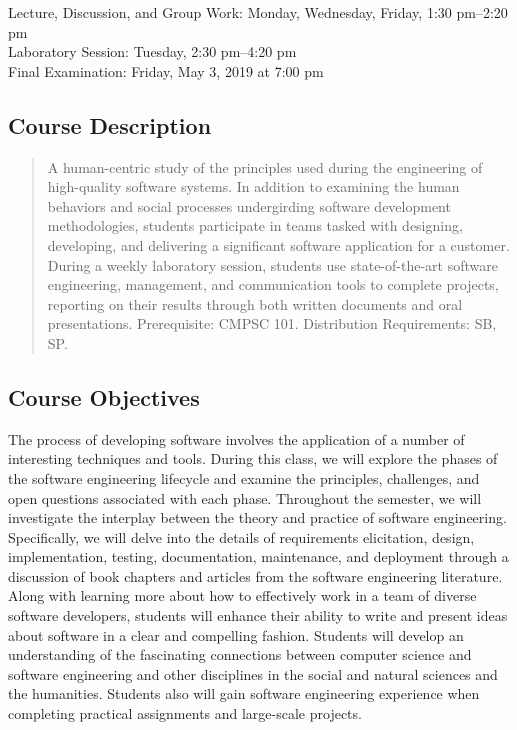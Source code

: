 \documentclass[11pt]{article}
\begin{document}
Lecture, Discussion, and Group Work: Monday, Wednesday, Friday, 1:30 pm--2:20 pm \\
Laboratory Session: Tuesday, 2:30 pm--4:20 pm \\
Final Examination: Friday, May 3, 2019 at 7:00 pm

\subsection*{Course Description}

\begin{quote}

A human-centric study of the principles used during the engineering of
high-quality software systems. In addition to examining the human behaviors and
social processes undergirding software development methodologies, students
participate in teams tasked with designing, developing, and delivering a
significant software application for a customer. During a weekly laboratory
session, students use state-of-the-art software engineering, management, and
communication tools to complete projects, reporting on their results through
both written documents and oral presentations. Prerequisite: CMPSC
101. Distribution Requirements: SB, SP.\@ \\

\end{quote}

\subsection*{Course Objectives}

The process of developing software involves the application of a number of
interesting techniques and tools. During this class, we will explore the phases
of the software engineering lifecycle and examine the principles, challenges,
and open questions associated with each phase. Throughout the semester, we will
investigate the interplay between the theory and practice of software
engineering. Specifically, we will delve into the details of requirements
elicitation, design, implementation, testing, documentation, maintenance, and
deployment through a discussion of book chapters and articles from the software
engineering literature. Along with learning more about how to effectively work
in a team of diverse software developers, students will enhance their ability
to write and present ideas about software in a clear and compelling fashion.
Students will develop an understanding of the fascinating connections between
computer science and software engineering and other disciplines in the social
and natural sciences and the humanities. Students also will gain software
engineering experience when completing practical assignments and large-scale
projects.
\end{document}
